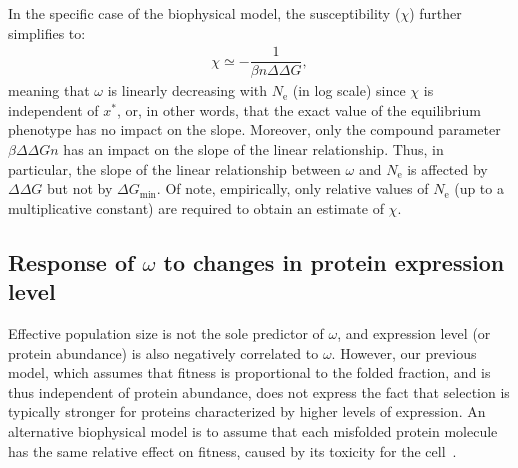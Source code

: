 \documentclass[authoryear]{elsarticle} %
\newcommand{\Ne}{N_{\text{e}}} %
\newcommand{\eq}{^{*}} %
\newcommand{\NbrSites}{n} %
\newcommand{\G}{G} %
\newcommand{\DeltaG}{\Delta \G} %
\newcommand{\EmpiricalDeltaDeltaG}{\Delta \DeltaG} %
\newcommand{\EmpiricalDeltaGmin}{\DeltaG_{\text{min}}} %
\providecommand{\DIFaddtex}[1]{{\protect\color{blue}\uwave{#1}}} %
\providecommand{\DIFdeltex}[1]{{\protect\color{red}\sout{#1}}}                      %
\providecommand{\DIFaddbegin}{} %
\providecommand{\DIFaddend}{} %
\providecommand{\DIFdelbegin}{} %
\providecommand{\DIFdelend}{} %
\providecommand{\DIFadd}[1]{\texorpdfstring{\DIFaddtex{#1}}{#1}} %
\providecommand{\DIFdel}[1]{\texorpdfstring{\DIFdeltex{#1}}{}} %
\begin{document}
In the specific case of the biophysical model, the susceptibility ($\chi$) further simplifies to:
\begin{gather}
    \chi \simeq -\dfrac{1}{\beta \NbrSites \EmpiricalDeltaDeltaG}, \label{eq:chi_application}
\end{gather}
meaning that $\omega$ is linearly decreasing with $\Ne$ (in log scale) since $\chi$ is independent of $x\eq$, or, in other words, that the exact value of the equilibrium {phenotype} has no impact on the slope.
Moreover, only the compound parameter \DIFdelbegin \DIFdel{$\beta \EmpiricalDeltaDeltaG \NbrSites$ }\DIFdelend \DIFaddbegin \DIFadd{$\beta \NbrSites \EmpiricalDeltaDeltaG$ }\DIFaddend has an impact on the slope of the linear relationship.
Thus, in particular, the slope of the linear relationship between $\omega$ and $\Ne$ is affected by $\EmpiricalDeltaDeltaG$ but not by $\EmpiricalDeltaGmin$.
Of note, empirically, only relative values of $\Ne$ (up to a multiplicative constant) are required to obtain an estimate of $\chi$.

\subsection{Response of $\omega$ to changes in protein expression level}
\label{sec:expression}

Effective population size is not the sole predictor of $\omega$, and expression level (or protein abundance) is also negatively correlated to $\omega$.
However, our previous model, which assumes that fitness is proportional to the folded fraction, and is thus independent of protein abundance, does not express the fact that selection is typically stronger for proteins characterized by higher levels of expression.
An alternative biophysical model is to assume that each misfolded protein molecule has the same relative effect on fitness, caused by its toxicity for the cell~\citep{Drummond2005a, Wilke2006, Drummond2008, Serohijos2012}.
\end{document}
